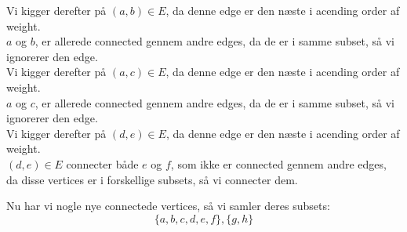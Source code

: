 \documentclass[a4paper,12pt]{article}
\begin{document}
Vi kigger derefter på $(a,b)\in E$, da denne edge er den næste i acending order af weight.\\
$a$ og $b$, er allerede connected gennem andre edges, da de er i samme subset, så vi ignorerer den edge.\\
Vi kigger derefter på $(a,c)\in E$, da denne edge er den næste i acending order af weight.\\
$a$ og $c$, er allerede connected gennem andre edges, da de er i samme subset, så vi ignorerer den edge.\\
Vi kigger derefter på $(d,e)\in E$, da denne edge er den næste i acending order af weight.\\
$(d,e)\in E$ connecter både $e$ og $f$, som ikke er connected gennem andre edges, da disse vertices er i forskellige subsets, så vi connecter dem.
\begin{figure}[H]
    \centering
    \caption*{}
\end{figure}
Nu har vi nogle nye connectede vertices, så vi samler deres subsets:
\[\{a,b,c,d,e,f\},\{g,h\}\]
\end{document}
